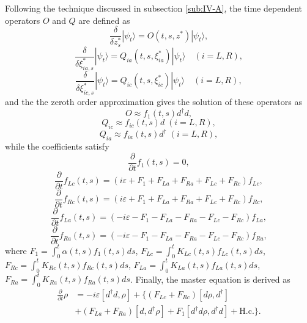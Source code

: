 \documentclass[preprint]{elsarticle}
\begin{document}
Following the technique discussed in subsection \ref{sub:IV-A}, the
time dependent operators $O$ and $Q$ are defined as
\begin{equation}
\frac{\delta}{\delta z_{s}^{*}}|\psi_{t}\rangle=O(t,s,z^{*})|\psi_{t}\rangle,
\end{equation}
\begin{equation}
\frac{\delta}{\delta\xi_{ia,s}^{*}}|\psi_{t}\rangle=Q_{ia}(t,s,\xi_{ia}^{*})|\psi_{t}\rangle\quad(i=L,R),
\end{equation}
\begin{equation}
\frac{\delta}{\delta\xi_{ic,s}^{*}}|\psi_{t}\rangle=Q_{ic}(t,s,\xi_{ic}^{*})|\psi_{t}\rangle\quad(i=L,R),
\end{equation}
and the the zeroth order approximation gives the solution of these
operators as
\begin{equation}
O\approx f_{1}(t,s)d^{\dagger}d,
\end{equation}
\begin{equation}
Q_{ic}\approx f_{ic}(t,s)d\;(i=L,R),
\end{equation}
\begin{equation}
Q_{ia}\approx f_{ia}(t,s)d^{\dagger}\;(i=L,R),
\end{equation}
while the coefficients satisfy
\begin{equation}
\frac{\partial}{\partial t}f_{1}(t,s)=0,
\end{equation}
\begin{equation}
\frac{\partial}{\partial t}f_{Lc}(t,s)=(i\varepsilon+F_{1}+F_{La}+F_{Ra}+F_{Lc}+F_{Rc})f_{Lc},
\end{equation}
\begin{equation}
\frac{\partial}{\partial t}f_{Rc}(t,s)=(i\varepsilon+F_{1}+F_{La}+F_{Ra}+F_{Lc}+F_{Rc})f_{Rc},
\end{equation}
\begin{equation}
\frac{\partial}{\partial t}f_{La}(t,s)=(-i\varepsilon-F_{1}-F_{La}-F_{Ra}-F_{Lc}-F_{Rc})f_{La},
\end{equation}
\begin{equation}
\frac{\partial}{\partial t}f_{Ra}(t,s)=(-i\varepsilon-F_{1}-F_{La}-F_{Ra}-F_{Lc}-F_{Rc})f_{Ra},
\end{equation}
where $F_{1}=\int_{0}^{t}\alpha(t,s)f_{1}(t,s)ds$, $F_{Lc}=\int_{0}^{t}K_{Lc}(t,s)f_{Lc}(t,s)ds$,
$F_{Rc}=\int_{0}^{t}K_{Rc}(t,s)f_{Rc}(t,s)ds$, $F_{La}=\int_{0}^{t}K_{La}(t,s)f_{La}(t,s)ds$,
$F_{Ra}=\int_{0}^{t}K_{Ra}(t,s)f_{Ra}(t,s)ds$. Finally, the master
equation is derived as
\begin{align}
\frac{\partial}{\partial t}\rho & =-i\varepsilon[d^{\dagger}d,\rho]+\{(F_{Lc}+F_{Rc})[d\rho,d^{\dagger}]\nonumber \\
 & +(F_{La}+F_{Ra})[d,d^{\dagger}\rho]+F_{1}[d^{\dagger}d\rho,d^{\dagger}d]+\mathrm{H.c.}\}.\label{MEQdot}
\end{align}
\end{document}
